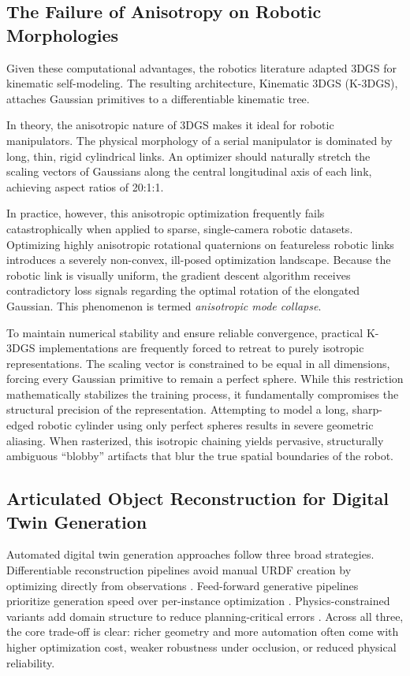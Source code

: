 \documentclass[12pt,a4paper,oneside]{report}
\begin{document}
\subsection{The Failure of Anisotropy on Robotic Morphologies}

Given these computational advantages, the robotics literature adapted 3DGS for kinematic self-modeling. The resulting architecture, Kinematic 3DGS (K-3DGS), attaches Gaussian primitives to a differentiable kinematic tree.

In theory, the anisotropic nature of 3DGS makes it ideal for robotic manipulators. The physical morphology of a serial manipulator is dominated by long, thin, rigid cylindrical links. An optimizer should naturally stretch the scaling vectors of Gaussians along the central longitudinal axis of each link, achieving aspect ratios of 20:1:1.

In practice, however, this anisotropic optimization frequently fails catastrophically when applied to sparse, single-camera robotic datasets. Optimizing highly anisotropic rotational quaternions on featureless robotic links introduces a severely non-convex, ill-posed optimization landscape. Because the robotic link is visually uniform, the gradient descent algorithm receives contradictory loss signals regarding the optimal rotation of the elongated Gaussian. This phenomenon is termed \textit{anisotropic mode collapse}.

To maintain numerical stability and ensure reliable convergence, practical K-3DGS implementations are frequently forced to retreat to purely isotropic representations. The scaling vector is constrained to be equal in all dimensions, forcing every Gaussian primitive to remain a perfect sphere. While this restriction mathematically stabilizes the training process, it fundamentally compromises the structural precision of the representation. Attempting to model a long, sharp-edged robotic cylinder using only perfect spheres results in severe geometric aliasing. When rasterized, this isotropic chaining yields pervasive, structurally ambiguous ``blobby'' artifacts that blur the true spatial boundaries of the robot.

\subsection{Articulated Object Reconstruction for Digital Twin Generation}

Automated digital twin generation approaches follow three broad strategies. Differentiable reconstruction pipelines avoid manual URDF creation by optimizing directly from observations \cite{heiden2022inferring, weng2024neural}. Feed-forward generative pipelines prioritize generation speed over per-instance optimization \cite{li2025art, wu2025urdfanything, wang2025artllm, wang2025kinematify}. Physics-constrained variants add domain structure to reduce planning-critical errors \cite{zhang2025simart, xu2025motionanymesh, wu2024aomgen}. Across all three, the core trade-off is clear: richer geometry and more automation often come with higher optimization cost, weaker robustness under occlusion, or reduced physical reliability.
\end{document}

